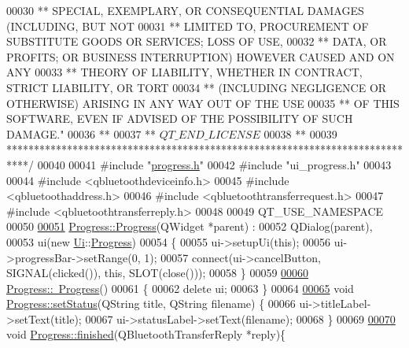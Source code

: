\begin{DoxyCode}
00030 \textcolor{comment}{** SPECIAL, EXEMPLARY, OR CONSEQUENTIAL DAMAGES (INCLUDING, BUT NOT}
00031 \textcolor{comment}{** LIMITED TO, PROCUREMENT OF SUBSTITUTE GOODS OR SERVICES; LOSS OF USE,}
00032 \textcolor{comment}{** DATA, OR PROFITS; OR BUSINESS INTERRUPTION) HOWEVER CAUSED AND ON ANY}
00033 \textcolor{comment}{** THEORY OF LIABILITY, WHETHER IN CONTRACT, STRICT LIABILITY, OR TORT}
00034 \textcolor{comment}{** (INCLUDING NEGLIGENCE OR OTHERWISE) ARISING IN ANY WAY OUT OF THE USE}
00035 \textcolor{comment}{** OF THIS SOFTWARE, EVEN IF ADVISED OF THE POSSIBILITY OF SUCH DAMAGE."}
00036 \textcolor{comment}{**}
00037 \textcolor{comment}{** $QT\_END\_LICENSE$}
00038 \textcolor{comment}{**}
00039 \textcolor{comment}{****************************************************************************/}
00040 
00041 \textcolor{preprocessor}{#include "\hyperlink{progress_8h}{progress.h}"}
00042 \textcolor{preprocessor}{#include "ui\_progress.h"}
00043 
00044 \textcolor{preprocessor}{#include <qbluetoothdeviceinfo.h>}
00045 \textcolor{preprocessor}{#include <qbluetoothaddress.h>}
00046 \textcolor{preprocessor}{#include <qbluetoothtransferrequest.h>}
00047 \textcolor{preprocessor}{#include <qbluetoothtransferreply.h>}
00048 
00049 QT\_USE\_NAMESPACE
00050 
\hypertarget{progress_8cpp_source.tex_l00051}{}\hyperlink{classProgress_a51e0a5625142fedf57d9d822afb1b8d4}{00051} \hyperlink{classProgress_a51e0a5625142fedf57d9d822afb1b8d4}{Progress::Progress}(QWidget *parent) :
00052     QDialog(parent),
00053     ui(new \hyperlink{namespaceUi}{Ui}::\hyperlink{classProgress}{Progress})
00054 \{
00055     ui->setupUi(\textcolor{keyword}{this});
00056     ui->progressBar->setRange(0, 1);
00057     connect(ui->cancelButton, SIGNAL(clicked()), \textcolor{keyword}{this}, SLOT(close()));
00058 \}
00059 
\hypertarget{progress_8cpp_source.tex_l00060}{}\hyperlink{classProgress_abfa443f16958768636a59a560b625317}{00060} \hyperlink{classProgress_abfa443f16958768636a59a560b625317}{Progress::~Progress}()
00061 \{
00062     \textcolor{keyword}{delete} ui;
00063 \}
00064 
\hypertarget{progress_8cpp_source.tex_l00065}{}\hyperlink{classProgress_ae2fec44e18b6cfb3e4cba984bdb16824}{00065} \textcolor{keywordtype}{void} \hyperlink{classProgress_ae2fec44e18b6cfb3e4cba984bdb16824}{Progress::setStatus}(QString title, QString filename) \{
00066     ui->titleLabel->setText(title);
00067     ui->statusLabel->setText(filename);
00068 \}
00069 
\hypertarget{progress_8cpp_source.tex_l00070}{}\hyperlink{classProgress_a15a8bf25ca7faafcc866813f1fd90677}{00070} \textcolor{keywordtype}{void} \hyperlink{classProgress_a15a8bf25ca7faafcc866813f1fd90677}{Progress::finished}(QBluetoothTransferReply *reply)\{

\end{DoxyCode}
